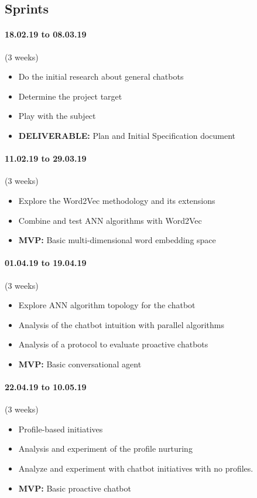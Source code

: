 \subsection{Sprints}

\paragraph{18.02.19 to 08.03.19} (3 weeks) 
\begin{itemize}
	\setlength\itemsep{0em}
	\item Do the initial research about general chatbots
	\item Determine the project target
	\item Play with the subject
	\item \textbf{DELIVERABLE:} Plan and Initial Specification document
\end{itemize}

\paragraph{11.02.19 to 29.03.19} (3 weeks)
\begin{itemize}
	\setlength\itemsep{0em}
	\item Explore the Word2Vec methodology and its extensions
	\item Combine and test ANN algorithms with Word2Vec
	\item \textbf{MVP:} Basic multi-dimensional word embedding space
\end{itemize}

\paragraph{01.04.19 to 19.04.19} (3 weeks)
\begin{itemize}
	\setlength\itemsep{0em}
	\item Explore ANN algorithm topology for the chatbot
	\item Analysis of the chatbot intuition with parallel algorithms
	\item Analysis of a protocol to evaluate proactive chatbots
	\item \textbf{MVP:} Basic conversational agent
\end{itemize}

\paragraph{22.04.19 to 10.05.19} (3 weeks)
\begin{itemize}
	\setlength\itemsep{0em}
	\item Profile-based initiatives
	\item Analysis and experiment of the profile nurturing 
	\item Analyze and experiment with chatbot initiatives with no profiles.
	\item \textbf{MVP:} Basic proactive chatbot
\end{itemize}

